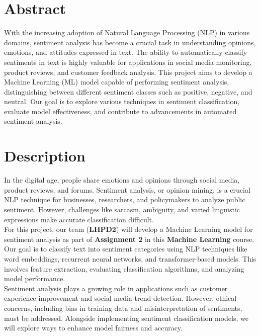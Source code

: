\chapter{Abstract}

With the increasing adoption of Natural Language Processing (NLP) in various domains, sentiment analysis has become a crucial task in understanding opinions, emotions, and attitudes expressed in text. The ability to automatically classify sentiments in text is highly valuable for applications in social media monitoring, product reviews, and customer feedback analysis. This project aims to develop a Machine Learning (ML) model capable of performing sentiment analysis, distinguishing between different sentiment classes such as positive, negative, and neutral. Our goal is to explore various techniques in sentiment classification, evaluate model effectiveness, and contribute to advancements in automated sentiment analysis. 

\chapter{Description}

In the digital age, people share emotions and opinions through social media, product reviews, and forums. Sentiment analysis, or opinion mining, is a crucial NLP technique for businesses, researchers, and policymakers to analyze public sentiment. However, challenges like sarcasm, ambiguity, and varied linguistic expressions make accurate classification difficult.\\

For this project, our team (\textbf{LHPD2}) will develop a Machine Learning model for sentiment analysis as part of \textbf{Assignment 2} in this \textbf{Machine Learning} course. Our goal is to classify text into sentiment categories using NLP techniques like word embeddings, recurrent neural networks, and transformer-based models. This involves feature extraction, evaluating classification algorithms, and analyzing model performance.\\

Sentiment analysis plays a growing role in applications such as customer experience improvement and social media trend detection. However, ethical concerns, including bias in training data and misinterpretation of sentiments, must be addressed. Alongside implementing sentiment classification models, we will explore ways to enhance model fairness and accuracy.\\

